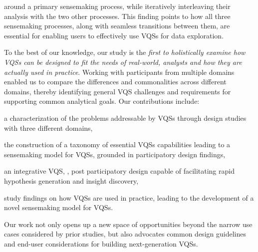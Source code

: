  \par {} around a primary sensemaking process, while iteratively interleaving their analysis with the two other processes. This finding points to how all three sensemaking processes, along with seamless transitions between them, are essential for enabling users to effectively use VQSs for data exploration.%
 \par To the best of our knowledge, our study is the \emph{first to holistically examine how VQSs can be designed to fit the needs of real-world,  analysts and how they are actually used in practice}. Working with participants from multiple domains enabled us to compare the differences and commonalities across different domains, thereby identifying general VQS challenges and requirements for supporting common analytical goals. Our contributions include:
 \begin{denselist}
 \item a characterization of the problems addressable by VQSs through design studies with three different domains,
 \item the construction of a taxonomy of essential VQSs capabilities leading to a sensemaking model for VQSs, grounded in participatory design findings, %
 \item an integrative VQS, \zvpp, post participatory design capable of facilitating rapid hypothesis generation and insight discovery,
 \item study findings on how VQSs are used in practice, leading to the development of a novel sensemaking model for VQSs. %
 \end{denselist}
 Our work not only opens up a new space of opportunities beyond the narrow use cases considered by prior studies, but also advocates common design guidelines and end-user considerations for building next-generation VQSs.
